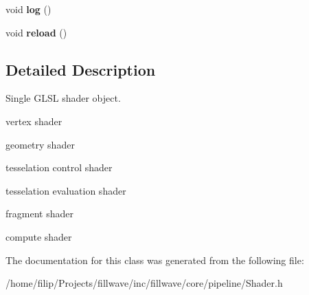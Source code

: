 \begin{DoxyCompactItemize}
\item 
\hypertarget{classfillwave_1_1core_1_1Shader_a3c7828a5e7097a0b1bb02bb9e38b6f5a}{}void {\bfseries log} ()\label{classfillwave_1_1core_1_1Shader_a3c7828a5e7097a0b1bb02bb9e38b6f5a}

\item 
\hypertarget{classfillwave_1_1core_1_1Shader_aaa76e3a2ce61560e599fb346bc15b23b}{}void {\bfseries reload} ()\label{classfillwave_1_1core_1_1Shader_aaa76e3a2ce61560e599fb346bc15b23b}

\end{DoxyCompactItemize}


\subsection{Detailed Description}
Single G\+L\+S\+L shader object. 


\begin{DoxyItemize}
\item vertex shader
\item geometry shader
\item tesselation control shader
\item tesselation evaluation shader
\item fragment shader
\item compute shader 
\end{DoxyItemize}

The documentation for this class was generated from the following file\+:\begin{DoxyCompactItemize}
\item 
/home/filip/\+Projects/fillwave/inc/fillwave/core/pipeline/Shader.\+h\end{DoxyCompactItemize}
